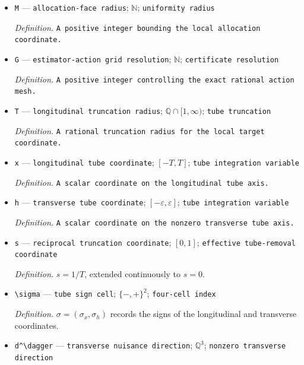 \documentclass{article}
\begin{document}
\begin{itemize}
  \par\smallskip\noindent\emph{Definition.} The terminating finite-input and diagonal interval algorithm in \(\mathrm{def:evaluator\text{-}handle}\).
  \item \texttt{M} --- \texttt{allocation-\allowbreak{}face radius}; \(\mathbb N\); \texttt{uniformity radius}
  \par\smallskip\noindent\emph{Definition.} \texttt{A positive integer bounding the local allocation coordinate.}
  \item \texttt{G} --- \texttt{estimator-\allowbreak{}action grid resolution}; \(\mathbb N\); \texttt{certificate resolution}
  \par\smallskip\noindent\emph{Definition.} \texttt{A positive integer controlling the exact rational action mesh.}
  \item \texttt{T} --- \texttt{longitudinal truncation radius}; \(\mathbb Q\cap[1,\infty)\); \texttt{tube truncation}
  \par\smallskip\noindent\emph{Definition.} \texttt{A rational truncation radius for the local target coordinate.}
  \item \texttt{x} --- \texttt{longitudinal tube coordinate}; \([-T,T]\); \texttt{tube integration variable}
  \par\smallskip\noindent\emph{Definition.} \texttt{A scalar coordinate on the longitudinal tube axis.}
  \item \texttt{h} --- \texttt{transverse tube coordinate}; \([-\varepsilon,\varepsilon]\); \texttt{tube integration variable}
  \par\smallskip\noindent\emph{Definition.} \texttt{A scalar coordinate on the nonzero transverse tube axis.}
  \item \texttt{s} --- \texttt{reciprocal truncation coordinate}; \([0,1]\); \texttt{effective tube-\allowbreak{}removal coordinate}
  \par\smallskip\noindent\emph{Definition.} \(s=1/T\), extended continuously to \(s=0\).
  \item \texttt{\textbackslash{}\allowbreak{}sigma} --- \texttt{tube sign cell}; \(\{-,+\}^2\); \texttt{four-\allowbreak{}cell index}
  \par\smallskip\noindent\emph{Definition.} \(\sigma=(\sigma_x,\sigma_h)\) records the signs of the longitudinal and transverse coordinates.
  \item \texttt{d\textasciicircum{}\textbackslash{}\allowbreak{}dagger} --- \texttt{transverse nuisance direction}; \(\mathbb Q^3\); \texttt{nonzero transverse direction}

\end{itemize}
\end{document}
